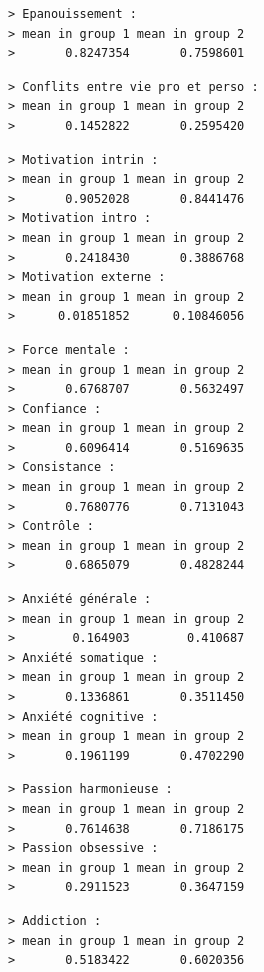 \documentclass[
]{article}
\begin{document}
\begin{verbatim}
> Epanouissement :
> mean in group 1 mean in group 2 
>       0.8247354       0.7598601
\end{verbatim}

\begin{verbatim}
> Conflits entre vie pro et perso :
> mean in group 1 mean in group 2 
>       0.1452822       0.2595420
\end{verbatim}

\begin{verbatim}
> Motivation intrin :
> mean in group 1 mean in group 2 
>       0.9052028       0.8441476
> Motivation intro :
> mean in group 1 mean in group 2 
>       0.2418430       0.3886768
> Motivation externe :
> mean in group 1 mean in group 2 
>      0.01851852      0.10846056
\end{verbatim}

\begin{verbatim}
> Force mentale :
> mean in group 1 mean in group 2 
>       0.6768707       0.5632497
> Confiance :
> mean in group 1 mean in group 2 
>       0.6096414       0.5169635
> Consistance :
> mean in group 1 mean in group 2 
>       0.7680776       0.7131043
> Contrôle :
> mean in group 1 mean in group 2 
>       0.6865079       0.4828244
\end{verbatim}

\begin{verbatim}
> Anxiété générale :
> mean in group 1 mean in group 2 
>        0.164903        0.410687
> Anxiété somatique :
> mean in group 1 mean in group 2 
>       0.1336861       0.3511450
> Anxiété cognitive :
> mean in group 1 mean in group 2 
>       0.1961199       0.4702290
\end{verbatim}

\begin{verbatim}
> Passion harmonieuse :
> mean in group 1 mean in group 2 
>       0.7614638       0.7186175
> Passion obsessive :
> mean in group 1 mean in group 2 
>       0.2911523       0.3647159
\end{verbatim}

\begin{verbatim}
> Addiction :
> mean in group 1 mean in group 2 
>       0.5183422       0.6020356
\end{verbatim}
\end{document}
